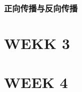 \documentclass[UTF_8]{ctexart}
\begin{document}
\clearpage
\subsubsection{正向传播与反向传播}



\clearpage
\section{WEKK 3}

\clearpage
\section{WEEK 4}
\end{document}
